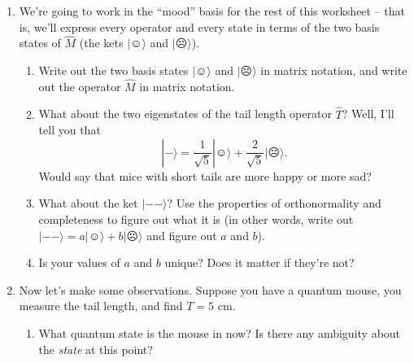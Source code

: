 \documentclass[10pt, letterpaper, twoside, openany]{article}
\newcommand{\ket}[1]{| #1 \rangle}
\newcommand{\braket}[2]{\langle #1 | #2 \rangle}
\begin{document}
\begin{enumerate}
\begin{enumerate}
\vspace{3in}

\item What do you think the operation $\braket{-}{--}$ should be?  What about $\braket{☺}{☹}$?

\end{enumerate}



\newpage

\item We're going to work in the ``mood'' basis for the rest of this worksheet -- that is, we'll express every operator and every state in terms of the two basis states of $\hat{M}$ (the kets $\ket{☺}$ and $\ket{☹}$).
\begin{enumerate}
\item Write out the two basis states $\ket{☺}$ and $\ket{☹}$ in matrix notation, and write out the operator $\hat{M}$ in matrix notation.

\vspace{2in}

\item What about the two eigenstates of the tail length operator $\hat{T}$?  Well, I'll tell you that
\[
\ket{-} = \frac{1}{\sqrt{5}} \ket{☺} + \frac{2}{\sqrt{5}} \ket{☹}.
\]
Would say that mice with short tails are more happy or more sad?

\vspace{1in}

\item What about the ket $\ket{--}$?  Use the properties of orthonormality and completeness to figure out what it is (in other words, write out $\ket{--} = a  \ket{☺} + b \ket{☹}$ and figure out $a$ and $b$).

\vspace{3in}

\item Is your values of $a$ and $b$ unique?  Does it matter if they're not?

\end{enumerate}

\newpage

\item Now let's make some observations.  Suppose you have a quantum mouse, you measure the tail length, and find $T = 5$ cm.
\begin{enumerate}
\item What quantum state is the mouse in now?  Is there any ambiguity about the \emph{state} at this point?
\vspace{2in}


\end{enumerate}
\end{enumerate}
\end{document}
